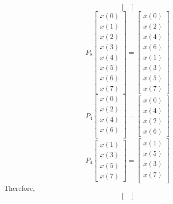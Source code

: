 \documentclass[journal,12pt,twocolumn]{IEEEtran}
\numberwithin{equation}{section}
\renewcommand\thesection{\arabic{section}}
\begin{document}
\begin{enumerate}[label=\arabic*.,ref=\thesection.\theenumi]
\begin{equation}
\begin{bmatrix}
\end{bmatrix}
\end{equation}
\begin{equation}
P_{8}
\begin{bmatrix}
x(0) \\ 
x(1) \\ 
x(2) \\ 
x(3) \\ 
x(4) \\ 
x(5) \\
x(6) \\
x(7)
\end{bmatrix}
 = 
\begin{bmatrix}
x(0) \\ 
x(2) \\ 
x(4) \\ 
x(6) \\
x(1) \\ 
x(3) \\ 
x(5) \\
x(7)
\end{bmatrix}
\end{equation}
\begin{equation}
P_{4}
\begin{bmatrix}
x(0) \\ 
x(2) \\ 
x(4) \\ 
x(6) \\
\end{bmatrix}
 = 
\begin{bmatrix}
x(0) \\ 
x(4) \\ 
x(2) \\
x(6)
\end{bmatrix}
\end{equation}
\begin{equation}
P_{4}
\begin{bmatrix}
x(1) \\ 
x(3) \\ 
x(5) \\
x(7)
\end{bmatrix}
 = 
\begin{bmatrix}
x(1) \\ 
x(5) \\ 
x(3) \\ 
x(7) \\
\end{bmatrix}
\end{equation}
Therefore,
\begin{equation}
\begin{bmatrix}

\end{bmatrix}
\end{equation}
\end{enumerate}
\end{document}
